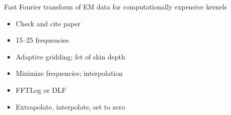 \documentclass[xcolor=svgnames, usepdftitle=false, aspectratio=169]{beamer}
\title{\vspace{2.5cm}\color{white}{\ttitle}}
\subtitle{\color{white}{using frequency- and Laplace-domain computations}}
\date{\color{white}{20 October 2021}}
\author{\vspace{-.3cm}\color{white}{Dieter Werthmüller and Evert Slob, TU Delft}}
\institute{}
\begin{document}

\maketitle %

\begin{frame}
  {Fast Fourier transform of EM data for computationally expensive kernels}

  \begin{itemize}
    \item Check and cite paper
    \item 15--25 frequencies
    \item Adaptive gridding; fct of skin depth
    \item Minimize frequencies; interpolation
    \item FFTLog or DLF
    \item Extrapolate, interpolate, set to zero
  \end{itemize}

\end{frame}
\end{document}
